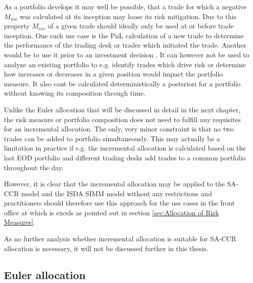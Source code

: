 \documentclass[../Thesis_AHoecherl.tex]{subfiles}
\begin{document}
As a portfolio develops it may well be possible, that a trade for which a negative $M_{inc}$ was calculated at its inception may loose its risk mitigation. 
Due to this property $M_{inc}$ of a given trade should ideally only be used at or before trade inception. 
One such use case is the \gls{PnL} calculation of a new trade to determine the performance of the trading desk or trader which initiated the trade. 
Another would be to use it prior to an investment decision \cite{tibiletti2001incremental}. 
It can however not be used to analyze an existing portfolio to e.g. identify trades which drive risk or determine how increases or decreases in a given position would impact the portfolio measure. 
It also cant be calculated deterministically a posteriori for a portfolio without knowing its composition through time.

Unlike the Euler allocation that will be discussed in detail in the next chapter, the risk measure or portfolio composition does not need to fulfill any requisites for an incremental allocation. 
The only, very minor constraint is that no two trades can be added to portfolio simultaneously.
This may actually be a limitation in practice if e.g. the incremental allocation is calculated based on the last EOD portfolio and different trading desks add trades to a common portfolio throughout the day.

However, it is clear that the incremental allocation may be applied to the \gls{SA-CCR} model and the \gls{ISDA SIMM} model without any restrictions and practitioners should therefore use this approach for the use cases in the front office at which is excels as pointed out in section \ref{sec:Allocation of Risk Measures}.

As no further analysis whether incremental allocation is suitable for \gls{SA-CCR} allocation is necessary, it will not be discussed further in this thesis.


\subsection{Euler allocation}\label{sec:Euler allocation}
\end{document}
